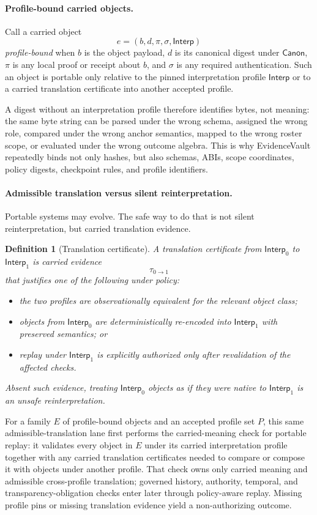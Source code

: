 \documentclass[11pt]{article}
\newtheorem{definition}{Definition}
\newcommand{\Interp}{\mathsf{Interp}}
\newcommand{\Canon}{\mathsf{Canon}}
\begin{document}
\paragraph{Profile-bound carried objects.}
Call a carried object
\[
  e=(b,d,\pi,\sigma,\Interp)
\]
\emph{profile-bound} when $b$ is the object payload, $d$ is its canonical digest under $\Canon$, $\pi$ is any local proof or receipt about $b$, and $\sigma$ is any required authentication.
Such an object is portable only relative to the pinned interpretation profile $\Interp$ or to a carried translation certificate into another accepted profile.

A digest without an interpretation profile therefore identifies bytes, not meaning: the same byte string can be parsed under the wrong schema, assigned the wrong role, compared under the wrong anchor semantics, mapped to the wrong roster scope, or evaluated under the wrong outcome algebra. This is why EvidenceVault repeatedly binds not only hashes, but also schemas, ABIs, scope coordinates, policy digests, checkpoint rules, and profile identifiers.

\paragraph{Admissible translation versus silent reinterpretation.}
Portable systems may evolve.
The safe way to do that is not silent reinterpretation, but carried translation evidence.

\begin{definition}[Translation certificate]
A translation certificate from $\Interp_0$ to $\Interp_1$ is carried evidence
\[
  \tau_{0\to1}
\]
that justifies one of the following under policy:
\begin{itemize}[leftmargin=*]
  \item the two profiles are observationally equivalent for the relevant object class;
  \item objects from $\Interp_0$ are deterministically re-encoded into $\Interp_1$ with preserved semantics; or
  \item replay under $\Interp_1$ is explicitly authorized only after revalidation of the affected checks.
\end{itemize}
Absent such evidence, treating $\Interp_0$ objects as if they were native to $\Interp_1$ is an unsafe reinterpretation.
\end{definition}

For a family $E$ of profile-bound objects and an accepted profile set $P$, this same admissible-translation lane first performs the carried-meaning check for portable replay: it validates every object in $E$ under its carried interpretation profile together with any carried translation certificates needed to compare or compose it with objects under another profile.
That check owns only carried meaning and admissible cross-profile translation; governed history, authority, temporal, and transparency-obligation checks enter later through policy-aware replay.
Missing profile pins or missing translation evidence yield a non-authorizing outcome.
\end{document}
